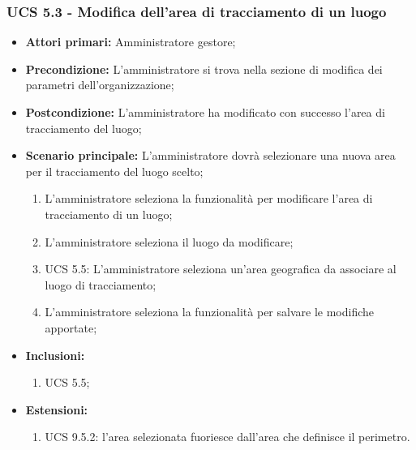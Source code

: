 \subsubsection{UCS 5.3 - Modifica dell'area di tracciamento di un luogo}%
\begin{itemize}
    \item \textbf{Attori primari:} Amministratore gestore;
    \item \textbf{Precondizione:} L'amministratore si trova nella sezione di modifica dei parametri dell'organizzazione;
    \item \textbf{Postcondizione:} L'amministratore ha modificato con successo l'area di tracciamento del luogo;
    \item \textbf{Scenario principale:} L'amministratore dovrà selezionare una nuova area per il tracciamento del luogo scelto;
    \begin{enumerate}%
        \item L'amministratore seleziona la funzionalità per modificare l'area di tracciamento di un luogo;
        \item L'amministratore seleziona il luogo da modificare;
        \item UCS 5.5: L'amministratore seleziona un'area geografica da associare al luogo di tracciamento;
        \item L'amministratore seleziona la funzionalità per salvare le modifiche apportate;
    \end{enumerate}
    \item \textbf{Inclusioni:}
    \begin{enumerate}
        \item UCS 5.5;
    \end{enumerate}
    \item \textbf{Estensioni:}
    \begin{enumerate}
        \item UCS 9.5.2: l'area selezionata fuoriesce dall'area che definisce il perimetro.
    \end{enumerate}
\end{itemize}

